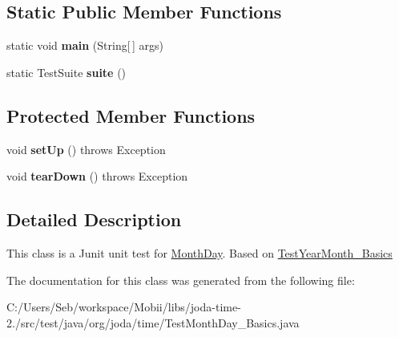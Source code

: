 \subsection*{Static Public Member Functions}
\begin{DoxyCompactItemize}
\item 
\hypertarget{classorg_1_1joda_1_1time_1_1_test_month_day___basics_a49a15881427936f245551ffff5d74011}{static void {\bfseries main} (String\mbox{[}$\,$\mbox{]} args)}\label{classorg_1_1joda_1_1time_1_1_test_month_day___basics_a49a15881427936f245551ffff5d74011}

\item 
\hypertarget{classorg_1_1joda_1_1time_1_1_test_month_day___basics_a6fec7a6bde1e1a445e530bfcea75d12d}{static Test\-Suite {\bfseries suite} ()}\label{classorg_1_1joda_1_1time_1_1_test_month_day___basics_a6fec7a6bde1e1a445e530bfcea75d12d}

\end{DoxyCompactItemize}
\subsection*{Protected Member Functions}
\begin{DoxyCompactItemize}
\item 
\hypertarget{classorg_1_1joda_1_1time_1_1_test_month_day___basics_a3d13f44e6fef1a7a408f5be4862aa083}{void {\bfseries set\-Up} ()  throws Exception }\label{classorg_1_1joda_1_1time_1_1_test_month_day___basics_a3d13f44e6fef1a7a408f5be4862aa083}

\item 
\hypertarget{classorg_1_1joda_1_1time_1_1_test_month_day___basics_a2f62bc426b7e6245e4e0dc234cf8e811}{void {\bfseries tear\-Down} ()  throws Exception }\label{classorg_1_1joda_1_1time_1_1_test_month_day___basics_a2f62bc426b7e6245e4e0dc234cf8e811}

\end{DoxyCompactItemize}


\subsection{Detailed Description}
This class is a Junit unit test for \hyperlink{classorg_1_1joda_1_1time_1_1_month_day}{Month\-Day}. Based on \hyperlink{classorg_1_1joda_1_1time_1_1_test_year_month___basics}{Test\-Year\-Month\-\_\-\-Basics} 

The documentation for this class was generated from the following file\-:\begin{DoxyCompactItemize}
\item 
C\-:/\-Users/\-Seb/workspace/\-Mobii/libs/joda-\/time-\/2./src/test/java/org/joda/time/Test\-Month\-Day\-\_\-\-Basics.\-java\end{DoxyCompactItemize}

